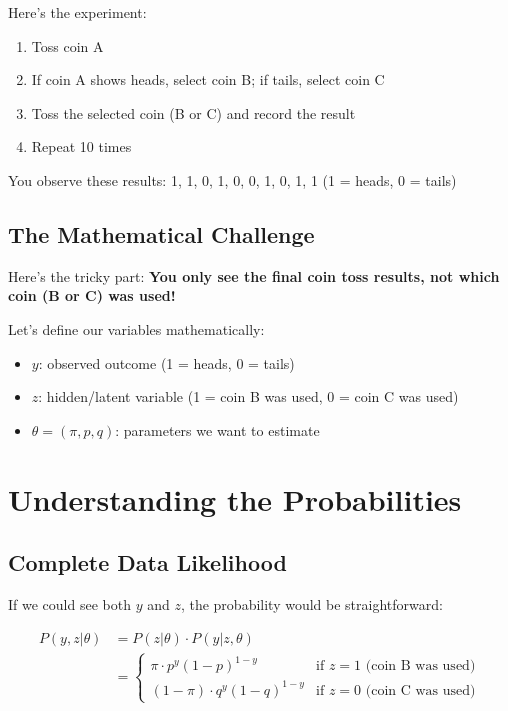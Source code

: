 \begin{notechapter}
Here's the experiment:
\begin{enumerate}
    \item Toss coin A
    \item If coin A shows heads, select coin B; if tails, select coin C
    \item Toss the selected coin (B or C) and record the result
    \item Repeat 10 times
\end{enumerate}

You observe these results: 1, 1, 0, 1, 0, 0, 1, 0, 1, 1 (1 = heads, 0 = tails)

\subsection{The Mathematical Challenge}

Here's the tricky part: \textbf{You only see the final coin toss results, not which coin (B or C) was used!}

Let's define our variables mathematically:
\begin{itemize}
    \item $y$: observed outcome (1 = heads, 0 = tails)
    \item $z$: hidden/latent variable (1 = coin B was used, 0 = coin C was used)
    \item $\theta = (\pi, p, q)$: parameters we want to estimate
\end{itemize}

\section{Understanding the Probabilities}

\subsection{Complete Data Likelihood}

If we could see both $y$ and $z$, the probability would be straightforward:

\begin{align*}
P(y, z|\theta) &= P(z|\theta) \cdot P(y|z,\theta) \\
&= \begin{cases}
\pi \cdot p^y(1-p)^{1-y} & \text{if } z = 1 \text{ (coin B was used)} \\
(1-\pi) \cdot q^y(1-q)^{1-y} & \text{if } z = 0 \text{ (coin C was used)}
\end{cases}
\end{align*}


\end{notechapter}
